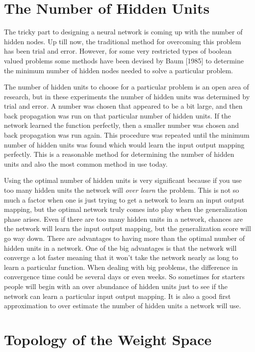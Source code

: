\section{The Number of Hidden Units}

	The tricky part to designing a neural network is coming up
with the number of hidden nodes.  Up till now, the traditional method
for overcoming this problem has been trial and error.  However, for
some very restricted types of boolean valued problems some methods
have been devised by Baum [1985] to determine the minimum number of
hidden nodes needed to solve a particular problem.  

	The number of hidden units to choose for a particular problem
is an open area of research, but in these experiments the number of
hidden units was determined by trial and error.  A number was chosen
that appeared to be a bit large, and then back propagation was run on
that particular number of hidden units.  If the network learned the
function perfectly, then a smaller number was chosen and back
propagation was run again.  This procedure was repeated until the
minimum number of hidden units was found which would learn the input
output mapping perfectly.  This is a reasonable method for determining
the number of hidden units and also the most common method in use
today.

	Using the optimal number of hidden units is very significant
because if you use too many hidden units the network will {\it over
learn} the problem.  This is not so much a factor when one is just
trying to get a network to learn an input output mapping, but the
optimal network truly comes into play when the generalization phase
arises.  Even if there are too many hidden units in a network, chances
are the network will learn the input output mapping, but the
generalization score will go way down.  There are advantages to having
more than the optimal number of hidden units in a network.  One of the
big advantages is that the network will converge a lot faster meaning
that it won't take the network nearly as long to learn a particular
function.  When dealing with big problems, the difference in
convergence time could be several days or even weeks.  So sometimes
for starters people will begin with an over abundance of hidden units
just to see if the network can learn a particular input output
mapping.  It is also a good first approximation to over estimate the
number of hidden units a network will use.

\section{Topology of the Weight Space}

